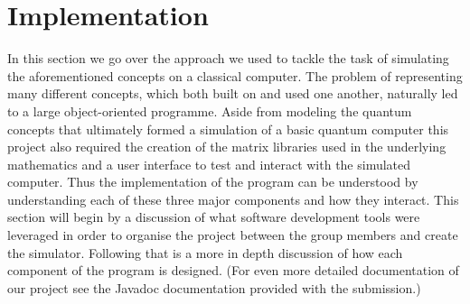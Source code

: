 \documentclass[bibliography=totocnumbered, 10pt]{article}
\theoremstyle{NoticeStyle}
\begin{document}
%
\section{Implementation}\label{sec:Implementation}
In this section we go over the approach we used to tackle the task of simulating the aforementioned concepts on a classical computer. The problem of representing many different concepts, which both built on and used one another, naturally led to a large object-oriented programme. Aside from modeling the quantum concepts that ultimately formed a simulation of a basic quantum computer this project also required the creation of the matrix libraries used in the underlying mathematics and a user interface to test and interact with the simulated computer. Thus the implementation of the program can be understood by understanding each of these three major components and how they interact. This section will begin by a discussion of what software development tools were leveraged in order to organise the project between the group members and create the simulator.  Following that is a more in depth discussion of how each component of the program is designed. (For even more detailed documentation of our project see the Javadoc documentation provided with the submission.)
\end{document}
